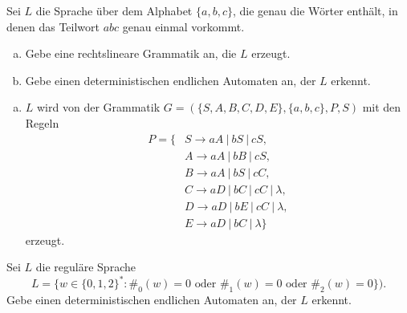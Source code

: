 \documentclass[german,headsepline]{scrartcl}
\theoremstyle{definition}
\begin{document}
	\begin{question}
		Sei $L$ die Sprache über dem Alphabet $\{a,b,c\}$, die genau die Wörter enthält,
		in denen das Teilwort $abc$ genau einmal vorkommt.
		\begin{enumerate}[(a)]
			\item Gebe eine rechtslineare Grammatik an, die $L$ erzeugt.
			\item Gebe einen deterministischen endlichen Automaten an, der $L$ erkennt.
		\end{enumerate}
	\end{question}
	\begin{solution}
		\begin{enumerate}[(a)]
			\item $L$ wird von der Grammatik $G=(\{S,A,B,C,D,E\},\{a,b,c\},P,S)$ mit den Regeln
				\begin{align*}
					P=\{&S\rightarrow aA~|~bS~|~cS, \\
					&A\rightarrow aA~|~bB~|~cS, \\
					&B\rightarrow aA~|~bS~|~cC, \\
					&C\rightarrow aD~|~bC~|~cC~|~\lambda, \\
					&D\rightarrow aD~|~bE~|~cC~|~\lambda, \\
					&E\rightarrow aD~|~bC~|~\lambda\}
				\end{align*}
				erzeugt.
		\end{enumerate}
	\end{solution}
	
	\begin{question}
		Sei $L$ die reguläre Sprache
		\[L=\{w\in\{0,1,2\}^*\colon\#_0(w)=0\text{ oder }\#_1(w)=0\text{ oder }\#_2(w)=0\}).\]
		Gebe einen deterministischen endlichen Automaten an, der $L$ erkennt.
	\end{question}
\end{document}
